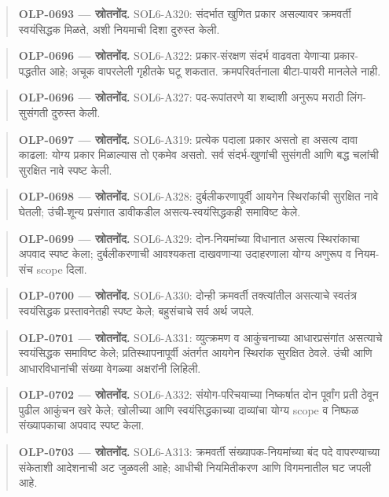 \begin{quote}\small\textbf{OLP-0693 — स्रोतनोंद.} SOL6-A320: संदर्भात खुणित प्रकार असल्यावर क्रमवर्ती स्वयंसिद्धक मिळते, अशी नियमाची दिशा दुरुस्त केली.\end{quote}
\begin{quote}\small\textbf{OLP-0696 — स्रोतनोंद.} SOL6-A322: प्रकार-संरक्षण संदर्भ वाढवता येणाऱ्या प्रकार-पद्धतीत आहे; अचूक वापरलेली गृहीतके घटू शकतात. क्रमपरिवर्तनाला बीटा-पायरी मानलेले नाही.\end{quote}
\begin{quote}\small\textbf{OLP-0696 — स्रोतनोंद.} SOL6-A327: पद-रूपांतरणे या शब्दाशी अनुरूप मराठी लिंग-सुसंगती दुरुस्त केली.\end{quote}
\begin{quote}\small\textbf{OLP-0697 — स्रोतनोंद.} SOL6-A319: प्रत्येक पदाला प्रकार असतो हा असत्य दावा काढला: योग्य प्रकार मिळाल्यास तो एकमेव असतो. सर्व संदर्भ-खुणांची सुसंगती आणि बद्ध चलांची सुरक्षित नावे स्पष्ट केली.\end{quote}
\begin{quote}\small\textbf{OLP-0698 — स्रोतनोंद.} SOL6-A328: दुर्बलीकरणापूर्वी आयगेन स्थिरांकांची सुरक्षित नावे घेतली; उंची-शून्य प्रसंगात डावीकडील असत्य-स्वयंसिद्धकही समाविष्ट केले.\end{quote}
\begin{quote}\small\textbf{OLP-0699 — स्रोतनोंद.} SOL6-A329: दोन-नियमांच्या विधानात असत्य स्थिरांकाचा अपवाद स्पष्ट केला; दुर्बलीकरणाची आवश्यकता दाखवणाऱ्या उदाहरणाला योग्य अणुरूप व नियम-संच scope दिला.\end{quote}
\begin{quote}\small\textbf{OLP-0700 — स्रोतनोंद.} SOL6-A330: दोन्ही क्रमवर्ती तक्त्यांतील असत्याचे स्वतंत्र स्वयंसिद्धक प्रस्तावनेतही स्पष्ट केले; बहुसंचाचे सर्व अर्थ जपले.\end{quote}
\begin{quote}\small\textbf{OLP-0701 — स्रोतनोंद.} SOL6-A331: व्युत्क्रमण व आकुंचनाच्या आधारप्रसंगांत असत्याचे स्वयंसिद्धक समाविष्ट केले; प्रतिस्थापनापूर्वी अंतर्गत आयगेन स्थिरांक सुरक्षित ठेवले. उंची आणि आधारविधानांची संख्या वेगळ्या अक्षरांनी लिहिली.\end{quote}
\begin{quote}\small\textbf{OLP-0702 — स्रोतनोंद.} SOL6-A332: संयोग-परिचयाच्या निष्कर्षात दोन पूर्वांग प्रती ठेवून पुढील आकुंचन खरे केले; खोलीच्या आणि स्वयंसिद्धकाच्या दाव्यांचा योग्य scope व निष्फळ संख्यापकाचा अपवाद स्पष्ट केला.\end{quote}
\begin{quote}\small\textbf{OLP-0703 — स्रोतनोंद.} SOL6-A313: क्रमवर्ती संख्यापक-नियमांच्या बंद पदे वापरण्याच्या संकेताशी आदेशनाची अट जुळवली आहे; आधीची नियमितीकरण आणि विगमनातील घट जपली आहे.\end{quote}
